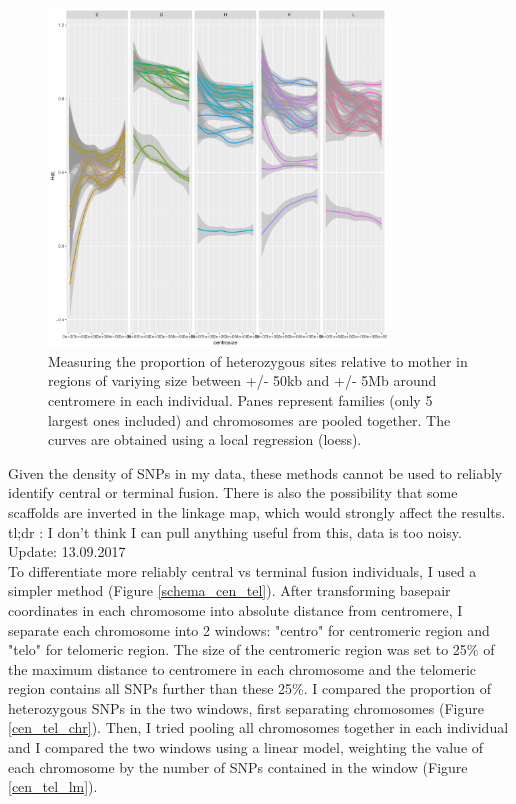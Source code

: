 \documentclass[10pt,a4paper]{report}
\begin{document}
\begin{figure}[h]
	\begin{center}
		\includegraphics[width=0.8\textwidth]{Num_CSD_loci/pooled_chrom_centrosize_50k_5M.pdf}
		\caption{Measuring the proportion of heterozygous sites relative to mother in regions of variying size between +/- 50kb and +/- 5Mb around centromere in each individual. Panes represent families (only 5 largest ones included) and chromosomes are pooled together. The curves are obtained using a local regression (loess).}
		\label{proto_surround_fusion}
	\end{center}
\end{figure}

Given the density of SNPs in my data, these methods cannot be used to reliably identify central or terminal fusion. There is also the possibility that some scaffolds are inverted in the linkage map, which would strongly affect the results.\\

tl;dr : I don't think I can pull anything useful from this, data is too noisy. \\

\FloatBarrier
Update: 13.09.2017\\
To differentiate more reliably central vs terminal fusion individuals, I used a simpler method (Figure \ref{schema_cen_tel}). After transforming basepair coordinates in each chromosome into absolute distance from centromere, I separate each chromosome into 2 windows: "centro" for centromeric region and "telo" for telomeric region. The size of the centromeric region was set to 25\% of the maximum distance to centromere in each chromosome and the telomeric region contains all SNPs further than these 25\%. I compared the proportion of heterozygous SNPs in the two windows, first separating chromosomes (Figure \ref{cen_tel_chr}). Then, I tried pooling all chromosomes together in each individual and I compared the two windows using a linear model, weighting the value of each chromosome by the number of SNPs contained in the window (Figure \ref{cen_tel_lm}).
\end{document}
